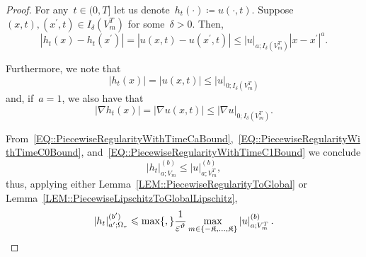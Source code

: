 \documentclass[12pt,a4paper]{amsart}
\makeatletter
\numberwithin{equation}{section}
\theoremstyle{definition}
\theoremstyle{remark}
\newcommand{\eps}{\varepsilon}
\newcommand{\abs}[1]{\left\lvert#1\right\rvert}
\renewcommand{\leq}{\leqslant}
\newcommand{\const}[1]{%
  \csname const@#1\endcsname%
}
\makeatother
\begin{document}
\begin{proof}
    For any~$t \in (0,T]$ let us denote~$h_t(\cdot) \coloneq u(\cdot, t)$. Suppose~$(x,t),(x^\prime, t) \in I_\delta(V_m^T)$ for some~$\delta > 0$. Then, %
    \begin{equation}\label{EQ::PiecewiseRegularityWithTimeCaBound}
        \abs{h_t(x)-h_t(x^\prime)} = \abs{u(x,t)-u(x^\prime,t)} \leq \abs{u}_{a;I_\delta(V_m^T)} \abs{x-x^\prime}^a.
    \end{equation}
    
    Furthermore, we note that
    \begin{equation}\label{EQ::PiecewiseRegularityWithTimeC0Bound}
        \abs{h_t(x)} = \abs{u(x,t)} \leq \abs{u}_{0; I_\delta(V_m^T)}
    \end{equation}
    and, if~$a = 1$, we also have that
    \begin{equation}\label{EQ::PiecewiseRegularityWithTimeC1Bound}
        \abs{\nabla h_t(x)} = \abs{\nabla u(x,t)} \leq \abs{\nabla u}_{0; I_\delta(V_m^T)}.
    \end{equation}
    
    From~\eqref{EQ::PiecewiseRegularityWithTimeCaBound},~\eqref{EQ::PiecewiseRegularityWithTimeC0Bound}, and~\eqref{EQ::PiecewiseRegularityWithTimeC1Bound} we conclude
    \begin{equation}
        \abs{h_t}_{a; V_m}^{(b)} \leq \abs{u}_{a;V_m^T}^{(b)},
    \end{equation}
    thus, applying either Lemma~\ref{LEM::PiecewiseRegularityToGlobal} or Lemma~\ref{LEM::PiecewiseLipschitzToGlobalLipschitz},
    \begin{equation}\label{EQ::gPiecewiseRegularityToGlobal}
        \abs{h_t}_{a^\prime; \Omega_\tau}^{(b^\prime)} \leq \max\{\const{CONST::PiecewiseRegularityToGlobal}, \const{CONST::PiecewiseLipschitzToGlobalLipschitz}\} \frac{1}{\eps^\vartheta} \max_{m \in \{-\mathfrak{K},\dots,\mathfrak{K}\}}\abs{u}_{a;V_m^T}^{(b)}.
    \end{equation}


\end{proof}
\end{document}
